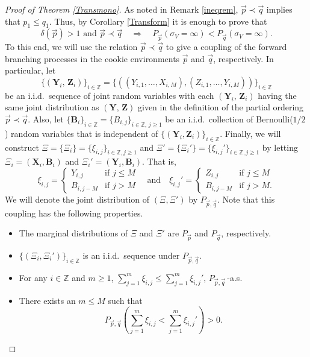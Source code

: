 \documentclass[reqno,letterpaper,11pt]{amsart}
\theoremstyle{remark}
\theoremstyle{definition}
\begin{document}
\begin{proof}[Proof of Theorem \ref{Transmono}]
 As noted in Remark \ref{ineqrem}, ${\vec{p}} \prec {\vec{q}}$ implies that $p_1 \leq q_1$. Thus, by Corollary \ref{Transform} it is enough to prove that 
\begin{equation}\label{Pineq}
 {\delta}({\vec{p}}) > 1 \text{ and } {\vec{p}} \prec {\vec{q}} \quad \Longrightarrow \quad P_{\vec{p}}( {\sigma}_V = \infty ) < P_{\vec{q}}( {\sigma}_V = \infty). 
\end{equation}
To this end, we will use the relation ${\vec{p}}\prec {\vec{q}}$ to give a coupling of the forward branching processes in the cookie environments ${\vec{p}}$ and ${\vec{q}}$, respectively. 
In particular, let $$\{(\mathbf{Y}_i, \, \mathbf{Z}_i )\}_{i \in {\mathbb Z}} = \{((Y_{i,1},\ldots,X_{i,M}), (Z_{i,1},\ldots,Y_{i,M})) \}_{i\in {\mathbb Z}}$$ be an i.i.d.\ sequence of joint random variables with each $(\mathbf{Y}_i, \, \mathbf{Z}_i)$ having the same joint distribution as  
$(\mathbf{Y},\, \mathbf{Z})$ given in the definition of the partial ordering ${\vec{p}} \prec {\vec{q}}$. Also, let $\{ \mathbf{B}_i \}_{i\in{\mathbb Z}} = \{ B_{i,j} \}_{i \in {\mathbb Z}, \, j \geq 1}$ be an i.i.d.\ collection of Bernoulli($1/2$) random variables that is independent of $\{(\mathbf{Y}_i, \mathbf{Z}_i)\}_{i\in {\mathbb Z}}$. Finally, we will construct $\Xi = \{ \Xi_i \} = \{ \xi_{i,j} \}_{i\in {\mathbb Z}, j\geq 1}$ and $ \Xi' = \{ \Xi_i' \} = \{ \xi_{i,j}' \}_{i\in {\mathbb Z}, j\geq 1}$ by letting $\Xi_i = (\mathbf{X}_i, \mathbf{B}_i)$ and $\Xi_i' = (\mathbf{Y}_i, \mathbf{B}_i)$. That is,
\[
 \xi_{i,j} = 
\begin{cases}
 Y_{i,j} & \text{if } j\leq M \\
 B_{i,j-M} & \text{if } j> M
\end{cases}
\quad\text{and}\quad
 \xi_{i,j}' = 
\begin{cases}
 Z_{i,j} & \text{if } j\leq M \\
 B_{i,j-M} & \text{if } j> M.
\end{cases}
\]
We will denote the joint distribution of $(\Xi,\Xi')$  by $P_{{\vec{p}},{\vec{q}}}$. 
Note that this coupling has the following properties. 
\begin{itemize}
 \item The marginal distributions of $\Xi$ and $\Xi'$ are $P_{\vec{p}}$ and $P_{\vec{q}}$, respectively. 
 \item $\{(\Xi_i, \Xi_i')\}_{i\in {\mathbb Z}}$ is an i.i.d.\ sequence under $P_{{\vec{p}},{\vec{q}}}$. 
 \item For any $i\in {\mathbb Z}$ and $m\geq 1$, $\sum_{j=1}^m \xi_{i,j} \leq \sum_{j=1}^m \xi_{i,j}'$, $P_{{\vec{p}},{\vec{q}}}$\,-a.s. 
 \item There exists an $m \leq M$ such that 
\begin{equation}\label{xisum}
P_{{\vec{p}},{\vec{q}}}\left( \sum_{j=1}^m \xi_{i,j} < \sum_{j=1}^m \xi_{i,j}' \right) > 0. 
\end{equation}
\end{itemize}


\end{proof}
\end{document}
